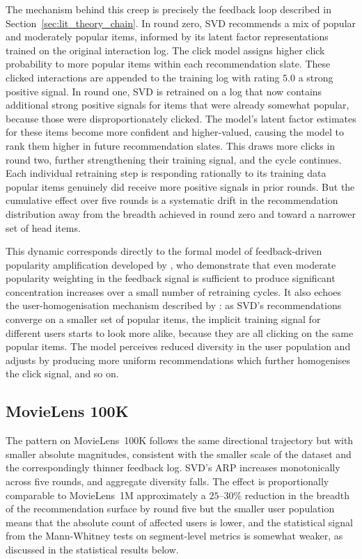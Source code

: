 \documentclass[11pt,a4paper]{report}
\begin{document}
The mechanism behind this creep is precisely the feedback loop described in Section~\ref{sec:lit_theory_chain}. In round zero, SVD recommends a mix of popular and moderately popular items, informed by its latent factor representations trained on the original interaction log. The click model assigns higher click probability to more popular items within each recommendation slate. These clicked interactions are appended to the training log with rating $5.0$ a strong positive signal. In round one, SVD is retrained on a log that now contains additional strong positive signals for items that were already somewhat popular, because those were disproportionately clicked. The model's latent factor estimates for these items become more confident and higher-valued, causing the model to rank them higher in future recommendation slates. This draws more clicks in round two, further strengthening their training signal, and the cycle continues. Each individual retraining step is responding rationally to its training data popular items genuinely did receive more positive signals in prior rounds. But the cumulative effect over five rounds is a systematic drift in the recommendation distribution away from the breadth achieved in round zero and toward a narrower set of head items.

This dynamic corresponds directly to the formal model of feedback-driven popularity amplification developed by \citet{mansoury2020feedback}, who demonstrate that even moderate popularity weighting in the feedback signal is sufficient to produce significant concentration increases over a small number of retraining cycles. It also echoes the user-homogenisation mechanism described by \citet{chaney2018algorithmic}: as SVD's recommendations converge on a smaller set of popular items, the implicit training signal for different users starts to look more alike, because they are all clicking on the same popular items. The model perceives reduced diversity in the user population and adjusts by producing more uniform recommendations which further homogenises the click signal, and so on.

\subsection*{MovieLens 100K}

The pattern on MovieLens~100K follows the same directional trajectory but with smaller absolute magnitudes, consistent with the smaller scale of the dataset and the correspondingly thinner feedback log. SVD's ARP increases monotonically across five rounds, and aggregate diversity falls. The effect is proportionally comparable to MovieLens~1M approximately a $25$--$30\%$ reduction in the breadth of the recommendation surface by round five but the smaller user population means that the absolute count of affected users is lower, and the statistical signal from the Mann-Whitney tests on segment-level metrics is somewhat weaker, as discussed in the statistical results below.
\end{document}
